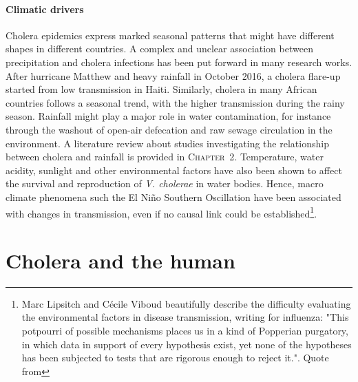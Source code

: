 \paragraph{Climatic drivers} Cholera epidemics express marked seasonal patterns that might have different shapes in different countries. A complex and unclear association between precipitation and cholera infections has been put forward in many research works. 
After hurricane Matthew and heavy rainfall in October 2016, a cholera flare-up started from low transmission in Haiti\cite{Pasetto:RealtimeForecastingCholera:2018}. Similarly, cholera in many African countries follows a seasonal trend, with the higher transmission during the rainy season\cite{Baracchini:SeasonalityCholeraDynamics:2017}.  Rainfall might play a major role in water contamination, for instance through the washout of open-air defecation and raw sewage circulation in the environment. A literature review about studies investigating the relationship between cholera and rainfall is provided in \textsc{Chapter~2}. Temperature, water acidity, sunlight and other environmental factors have also been shown to affect the survival and reproduction of \textit{V. cholerae} in water bodies. Hence, macro climate phenomena such the El Niño Southern Oscillation have been associated with changes in transmission, even if no causal link could be established\cite[-2\baselineskip]{Pascual:CholeraDynamicsNinoSouthern:2000}\footnote{Marc Lipsitch and Cécile Viboud beautifully describe the difficulty evaluating the environmental factors in disease transmission, writing for influenza: "This potpourri of possible mechanisms places us in a kind of Popperian purgatory, in which data in support of every hypothesis exist, yet none of the hypotheses has been subjected to tests that are rigorous enough to reject it.". Quote from  }.

\section{Cholera and the human} 
